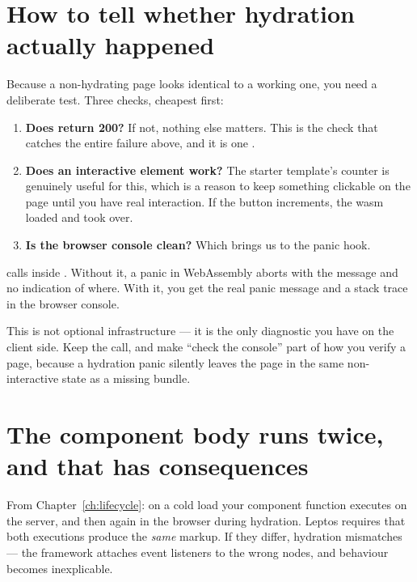 \section{How to tell whether hydration actually happened}

Because a non-hydrating page looks identical to a working one, you need a deliberate test. Three
checks, cheapest first:

\begin{enumerate}
  \item \textbf{Does  return 200?} If not, nothing else matters. This is
    the check that catches the entire failure above, and it is one .
  \item \textbf{Does an interactive element work?} The starter template's counter is genuinely
    useful for this, which is a reason to keep something clickable on the page until you have real
    interaction. If the button increments, the wasm loaded and took over.
  \item \textbf{Is the browser console clean?} Which brings us to the panic hook.
\end{enumerate}

\begin{why}
 calls  inside .
Without it, a panic in WebAssembly aborts with the message  and no
indication of where. With it, you get the real panic message and a stack trace in the browser
console.

This is not optional infrastructure --- it is the only diagnostic you have on the client side.
Keep the call, and make ``check the console'' part of how you verify a page, because a hydration
panic silently leaves the page in the same non-interactive state as a missing bundle.
\end{why}

\section{The component body runs twice, and that has consequences}

From Chapter~\ref{ch:lifecycle}: on a cold load your component function executes on the server, and
then again in the browser during hydration. Leptos requires that both executions produce the
\emph{same} markup. If they differ, hydration mismatches --- the framework attaches event listeners
to the wrong nodes, and behaviour becomes inexplicable.


